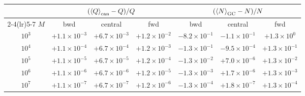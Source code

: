 \begin{tabular}{@{}c ccc ccc@{}}
\toprule
 & \multicolumn{3}{c}{$(\left\langle Q\right\rangle_{\rm can}-Q)/Q$} & \multicolumn{3}{c}{$(\left\langle N\right\rangle_{\rm GC}-N)/N$}\\
\cmidrule(lr){2-4}\cmidrule(lr){5-7}
$M$ & bwd & central & fwd & bwd & central & fwd\\
\midrule
$10^{3}$ & $+1.1\!\times\!10^{-3}$ & $+6.7\!\times\!10^{-3}$ & $+1.2\!\times\!10^{-2}$ & $-8.2\!\times\!10^{-1}$ & $-1.1\!\times\!10^{-1}$ & $+1.3\!\times\!10^{0}$ \\
$10^{4}$ & $+1.1\!\times\!10^{-4}$ & $+6.7\!\times\!10^{-4}$ & $+1.2\!\times\!10^{-3}$ & $-1.3\!\times\!10^{-1}$ & $-9.5\!\times\!10^{-4}$ & $+1.3\!\times\!10^{-1}$ \\
$10^{5}$ & $+1.1\!\times\!10^{-5}$ & $+6.7\!\times\!10^{-5}$ & $+1.2\!\times\!10^{-4}$ & $-1.3\!\times\!10^{-2}$ & $+7.0\!\times\!10^{-6}$ & $+1.3\!\times\!10^{-2}$ \\
$10^{6}$ & $+1.1\!\times\!10^{-6}$ & $+6.7\!\times\!10^{-6}$ & $+1.2\!\times\!10^{-5}$ & $-1.3\!\times\!10^{-3}$ & $+1.7\!\times\!10^{-6}$ & $+1.3\!\times\!10^{-3}$ \\
$10^{7}$ & $+1.1\!\times\!10^{-7}$ & $+6.7\!\times\!10^{-7}$ & $+1.2\!\times\!10^{-6}$ & $-1.3\!\times\!10^{-4}$ & $+1.8\!\times\!10^{-7}$ & $+1.3\!\times\!10^{-4}$ \\
\bottomrule
\end{tabular}
